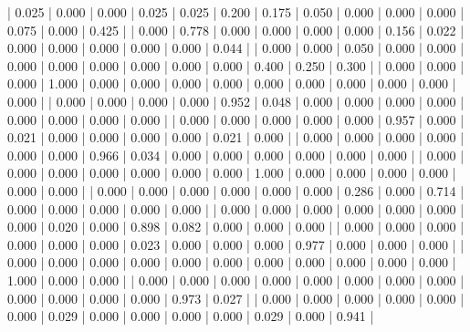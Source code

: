 | 0.025 | 0.000 | 0.000 | 0.025 | 0.025 | 0.200 | 0.175 | 0.050 | 0.000 | 0.000 | 0.000 | 0.075 | 0.000 | 0.425 |
| 0.000 | 0.778 | 0.000 | 0.000 | 0.000 | 0.000 | 0.156 | 0.022 | 0.000 | 0.000 | 0.000 | 0.000 | 0.000 | 0.044 |
| 0.000 | 0.000 | 0.050 | 0.000 | 0.000 | 0.000 | 0.000 | 0.000 | 0.000 | 0.000 | 0.000 | 0.400 | 0.250 | 0.300 |
| 0.000 | 0.000 | 0.000 | 1.000 | 0.000 | 0.000 | 0.000 | 0.000 | 0.000 | 0.000 | 0.000 | 0.000 | 0.000 | 0.000 |
| 0.000 | 0.000 | 0.000 | 0.000 | 0.952 | 0.048 | 0.000 | 0.000 | 0.000 | 0.000 | 0.000 | 0.000 | 0.000 | 0.000 |
| 0.000 | 0.000 | 0.000 | 0.000 | 0.000 | 0.957 | 0.000 | 0.021 | 0.000 | 0.000 | 0.000 | 0.000 | 0.021 | 0.000 |
| 0.000 | 0.000 | 0.000 | 0.000 | 0.000 | 0.000 | 0.966 | 0.034 | 0.000 | 0.000 | 0.000 | 0.000 | 0.000 | 0.000 |
| 0.000 | 0.000 | 0.000 | 0.000 | 0.000 | 0.000 | 0.000 | 1.000 | 0.000 | 0.000 | 0.000 | 0.000 | 0.000 | 0.000 |
| 0.000 | 0.000 | 0.000 | 0.000 | 0.000 | 0.000 | 0.286 | 0.000 | 0.714 | 0.000 | 0.000 | 0.000 | 0.000 | 0.000 |
| 0.000 | 0.000 | 0.000 | 0.000 | 0.000 | 0.000 | 0.000 | 0.020 | 0.000 | 0.898 | 0.082 | 0.000 | 0.000 | 0.000 |
| 0.000 | 0.000 | 0.000 | 0.000 | 0.000 | 0.000 | 0.023 | 0.000 | 0.000 | 0.000 | 0.977 | 0.000 | 0.000 | 0.000 |
| 0.000 | 0.000 | 0.000 | 0.000 | 0.000 | 0.000 | 0.000 | 0.000 | 0.000 | 0.000 | 0.000 | 1.000 | 0.000 | 0.000 |
| 0.000 | 0.000 | 0.000 | 0.000 | 0.000 | 0.000 | 0.000 | 0.000 | 0.000 | 0.000 | 0.000 | 0.000 | 0.973 | 0.027 |
| 0.000 | 0.000 | 0.000 | 0.000 | 0.000 | 0.000 | 0.029 | 0.000 | 0.000 | 0.000 | 0.000 | 0.029 | 0.000 | 0.941 |
